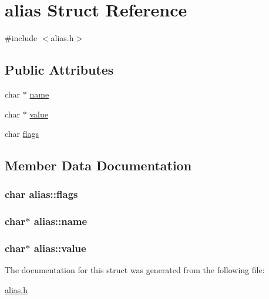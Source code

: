 \hypertarget{structalias}{}\section{alias Struct Reference}
\label{structalias}


{\ttfamily \#include $<$alias.\+h$>$}

\subsection*{Public Attributes}
\begin{DoxyCompactItemize}
\item 
char $\ast$ \hyperlink{structalias_ad60ea68bfe90ae7f819a50dcf9efb6ef}{name}
\item 
char $\ast$ \hyperlink{structalias_a42c385d758503058c7680ffc8f348823}{value}
\item 
char \hyperlink{structalias_aa08ab0a17e8fb98fe9862e752f37fdf9}{flags}
\end{DoxyCompactItemize}


\subsection{Member Data Documentation}
\subsubsection[{\texorpdfstring{flags}{flags}}]{\setlength{\rightskip}{0pt plus 5cm}char alias\+::flags}\hypertarget{structalias_aa08ab0a17e8fb98fe9862e752f37fdf9}{}\label{structalias_aa08ab0a17e8fb98fe9862e752f37fdf9}
\subsubsection[{\texorpdfstring{name}{name}}]{\setlength{\rightskip}{0pt plus 5cm}char$\ast$ alias\+::name}\hypertarget{structalias_ad60ea68bfe90ae7f819a50dcf9efb6ef}{}\label{structalias_ad60ea68bfe90ae7f819a50dcf9efb6ef}
\subsubsection[{\texorpdfstring{value}{value}}]{\setlength{\rightskip}{0pt plus 5cm}char$\ast$ alias\+::value}\hypertarget{structalias_a42c385d758503058c7680ffc8f348823}{}\label{structalias_a42c385d758503058c7680ffc8f348823}


The documentation for this struct was generated from the following file\+:\begin{DoxyCompactItemize}
\item 
\hyperlink{alias_8h}{alias.\+h}\end{DoxyCompactItemize}
